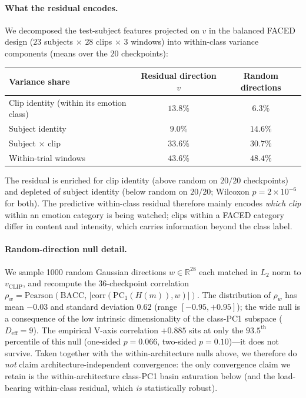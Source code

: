 \begin{revblock}
\paragraph{What the residual encodes.} We decomposed the test-subject
features projected on $v$ in the balanced FACED design ($23$ subjects
$\times$ $28$ clips $\times$ $3$ windows) into within-class variance
components (means over the $20$ checkpoints):

\begin{center}
\small
\begin{tabular}{lcc}
\toprule
Variance share & Residual direction $v$ & Random directions \\
\midrule
Clip identity (within its emotion class) & $13.8\%$ & $6.3\%$ \\
Subject identity & $9.0\%$ & $14.6\%$ \\
Subject $\times$ clip & $33.6\%$ & $30.7\%$ \\
Within-trial windows & $43.6\%$ & $48.4\%$ \\
\bottomrule
\end{tabular}
\end{center}
The residual is enriched for clip identity (above random on $20/20$
checkpoints) and depleted of subject identity (below random on $20/20$;
Wilcoxon $p{=}2{\times}10^{-6}$ for both). The predictive within-class
residual therefore mainly encodes \emph{which clip} within an emotion
category is being watched; clips within a FACED category differ in
content and intensity, which carries information beyond the class label.
\end{revblock}

\paragraph{Random-direction null detail.}
We sample 1000 random Gaussian directions $w \in \mathbb{R}^{28}$ each
matched in $L_2$ norm to $v_{\mathrm{CLIP}}$, and recompute the
36-checkpoint correlation $\rho_w = \mathrm{Pearson}(\mathrm{BACC},\,
|\mathrm{corr}(\mathrm{PC}_1(H(m)), w)|)$. The distribution of $\rho_w$ has mean $-0.03$ and
standard deviation $0.62$ (range $[-0.95, +0.95]$); the wide null is a
consequence of the low intrinsic dimensionality of the class-PC1
subspace ($D_{\mathrm{eff}}\!=\!9$). The empirical V-axis correlation
$+0.885$ sits at only the $93.5^\mathrm{th}$ percentile of this null
(one-sided $p{=}0.066$, two-sided $p{=}0.10$)---it does not survive.
Taken together with the within-architecture nulls above, we therefore
do \emph{not} claim architecture-independent convergence: the only
convergence claim we retain is the within-architecture class-PC1 basin
saturation below (and the load-bearing within-class residual, which
\emph{is} statistically robust).

